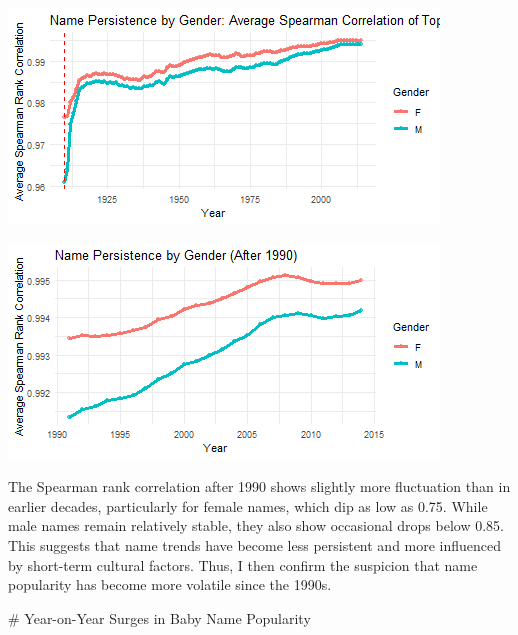 \documentclass[11pt,preprint]{elsarticle}
\let\origfigure\figure
\let\endorigfigure\endfigure
\renewenvironment{figure}[1][2] {
    \expandafter\origfigure\expandafter[H]
} {
    \endorigfigure
}
\numberwithin{equation}{section}
\numberwithin{figure}{section}
\numberwithin{table}{section}
\begin{document}
\begin{figure}[H]

{\centering \includegraphics{23034103_Q1USbabynames_files/figure-latex/Figure 1a-1} 

}

\caption{Caption Here \label{Figure1}}\label{fig:Figure 1a-1}
\end{figure}
\begin{figure}[H]

{\centering \includegraphics{23034103_Q1USbabynames_files/figure-latex/Figure 1a-2} 

}

\caption{Caption Here \label{Figure1}}\label{fig:Figure 1a-2}
\end{figure}

The Spearman rank correlation after 1990 shows slightly more fluctuation
than in earlier decades, particularly for female names, which dip as low
as 0.75. While male names remain relatively stable, they also show
occasional drops below 0.85. This suggests that name trends have become
less persistent and more influenced by short-term cultural factors.
Thus, I then confirm the suspicion that name popularity has become more
volatile since the 1990s.

\# Year-on-Year Surges in Baby Name Popularity
\end{document}
